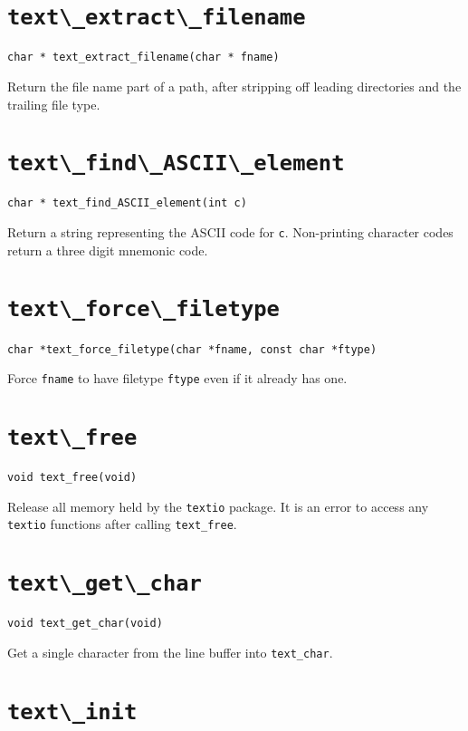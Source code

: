 \section{\protect\verb+text\_extract\_filename+}
\begin{verbatim}
char * text_extract_filename(char * fname)
\end{verbatim}
Return the file name part of a path, after stripping off leading directories
and the trailing file type.

\section{\protect\verb+text\_find\_ASCII\_element+}
\begin{verbatim}
char * text_find_ASCII_element(int c)
\end{verbatim}
Return a string representing the ASCII code for {\tt c}. Non-printing
character codes return a three digit mnemonic code.

\section{\protect\verb+text\_force\_filetype+}
\begin{verbatim}
char *text_force_filetype(char *fname, const char *ftype)
\end{verbatim}
Force {\tt fname} to have filetype {\tt ftype} even if it already has one.

\section{\protect\verb+text\_free+}
\begin{verbatim}
void text_free(void)
\end{verbatim}
Release all memory held by the {\tt textio} package. It is an error to access any
{\tt textio} functions after calling \verb+text_free+.

\section{\protect\verb+text\_get\_char+}
\begin{verbatim}
void text_get_char(void)
\end{verbatim}
Get a single character from the line buffer into \verb+text_char+.
\section{\protect\verb+text\_init+}

